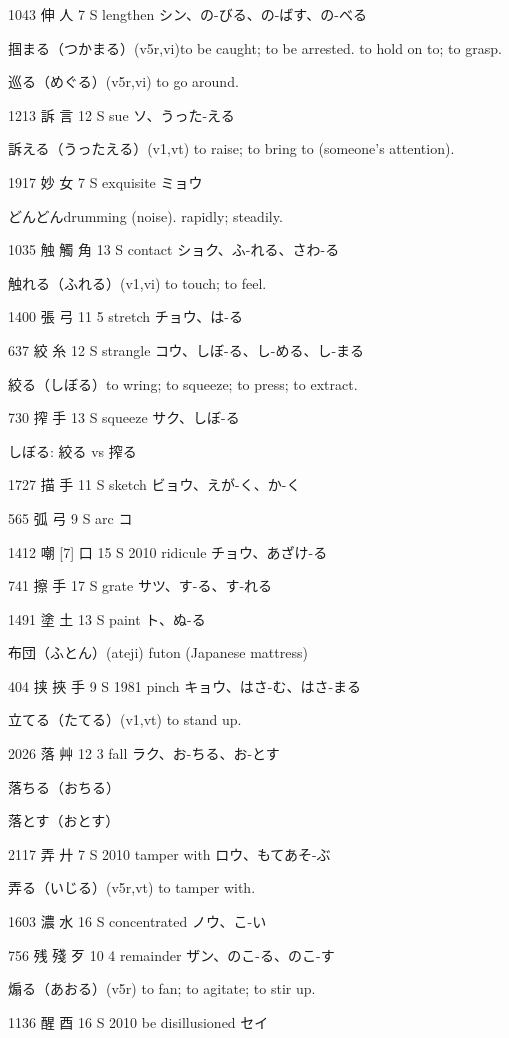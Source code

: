 1043	伸		人	7	S		lengthen	シン、の-びる、の-ばす、の-べる

掴まる（つかまる）(v5r,vi)to be caught; to be arrested. to hold on to; to grasp.

巡る（めぐる）(v5r,vi) to go around.

1213	訴		言	12	S		sue	ソ、うった-える

訴える（うったえる）(v1,vt) to raise; to bring to (someone's attention).

1917	妙		女	7	S		exquisite	ミョウ

どんどんdrumming (noise). rapidly; steadily.

1035	触	觸	角	13	S		contact	ショク、ふ-れる、さわ-る

触れる（ふれる）(v1,vi) to touch; to feel.

1400	張		弓	11	5		stretch	チョウ、は-る

637	絞		糸	12	S		strangle	コウ、しぼ-る、し-める、し-まる

絞る（しぼる）to wring; to squeeze; to press; to extract.

730	搾		手	13	S		squeeze	サク、しぼ-る

しぼる:
絞る vs 搾る

1727	描		手	11	S		sketch	ビョウ、えが-く、か-く

565	弧		弓	9	S		arc	コ

1412	嘲 [7]		口	15	S	2010	ridicule	チョウ、あざけ-る

741	擦		手	17	S		grate	サツ、す-る、す-れる

1491	塗		土	13	S		paint	ト、ぬ-る

布団（ふとん）(ateji) futon (Japanese mattress)

404	挟	挾	手	9	S	1981	pinch	キョウ、はさ-む、はさ-まる

立てる（たてる）(v1,vt) to stand up.

2026	落		艸	12	3		fall	ラク、お-ちる、お-とす

落ちる（おちる）

落とす（おとす）

2117	弄		廾	7	S	2010	tamper with	ロウ、もてあそ-ぶ

弄る（いじる）(v5r,vt) to tamper with.

1603	濃		水	16	S		concentrated	ノウ、こ-い

756	残	殘	歹	10	4		remainder	ザン、のこ-る、のこ-す

煽る（あおる）(v5r) to fan; to agitate; to stir up.

1136	醒		酉	16	S	2010	be disillusioned	セイ


